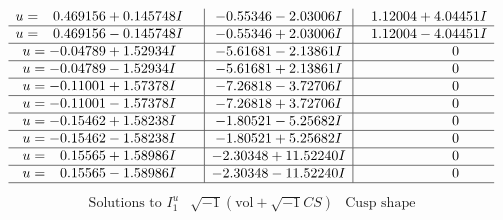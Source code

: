 \documentclass[1p]{elsarticle_modified}
\theoremstyle{definition}
\newcommand{\I}{\sqrt{-1}}
\begin{document}
$$\begin{array}{c|c|c}
\begin{aligned}
u &= \phantom{-}0.469156 + 0.145748 I\end{aligned}
 & -0.55346 - 2.03006 I & \phantom{-}1.12004 + 4.04451 I \\ \hline\begin{aligned}
u &= \phantom{-}0.469156 - 0.145748 I\end{aligned}
 & -0.55346 + 2.03006 I & \phantom{-}1.12004 - 4.04451 I \\ \hline\begin{aligned}
u &= -0.04789 + 1.52934 I\end{aligned}
 & -5.61681 - 2.13861 I & \phantom{-0.000000 } 0 \\ \hline\begin{aligned}
u &= -0.04789 - 1.52934 I\end{aligned}
 & -5.61681 + 2.13861 I & \phantom{-0.000000 } 0 \\ \hline\begin{aligned}
u &= -0.11001 + 1.57378 I\end{aligned}
 & -7.26818 - 3.72706 I & \phantom{-0.000000 } 0 \\ \hline\begin{aligned}
u &= -0.11001 - 1.57378 I\end{aligned}
 & -7.26818 + 3.72706 I & \phantom{-0.000000 } 0 \\ \hline\begin{aligned}
u &= -0.15462 + 1.58238 I\end{aligned}
 & -1.80521 - 5.25682 I & \phantom{-0.000000 } 0 \\ \hline\begin{aligned}
u &= -0.15462 - 1.58238 I\end{aligned}
 & -1.80521 + 5.25682 I & \phantom{-0.000000 } 0 \\ \hline\begin{aligned}
u &= \phantom{-}0.15565 + 1.58986 I\end{aligned}
 & -2.30348 + 11.52240 I & \phantom{-0.000000 } 0 \\ \hline\begin{aligned}
u &= \phantom{-}0.15565 - 1.58986 I\end{aligned}
 & -2.30348 - 11.52240 I & \phantom{-0.000000 } 0\\
 \hline 
 \end{array}$$\newpage$$\begin{array}{c|c|c}  
\text{Solutions to }I^u_{1}& \I (\text{vol} + \sqrt{-1}CS) & \text{Cusp shape}\\
 \hline 
\begin{aligned}

\end{aligned}
\end{array}$$
\end{document}
